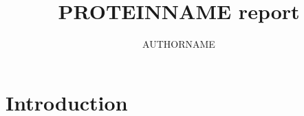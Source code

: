 \documentclass[12pt]{article}
\begin{document}
   

\title{\bf PROTEINNAME report}
\author{AUTHORNAME}
\maketitle
\vspace {0.2 in}

\tableofcontents

\section{Introduction}
\end{document}
